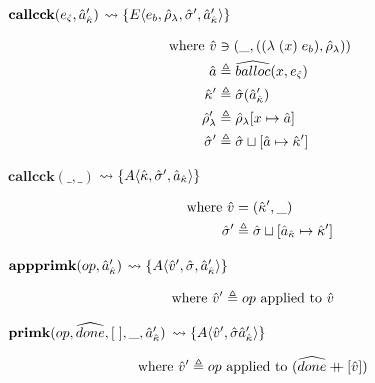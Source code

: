 \documentclass[12pt,draft]{article}
\newcommand\mdoubleplus{\ensuremath{\mathbin{+\mkern-9mu+}}}
\newcommand{\singlelamsyn}[2]{(\lambda\;(#1)\;#2)}
\begin{document}
\begin{multicols*}{2}
\begin{center}
  $\textbf{callcck}(e_{\hat{\varsigma}} , \hat{a}_{\hat{\kappa}}')$
  $\leadsto \{E\langle e_b , \hat{\rho}_{\lambda} , \hat{\sigma}' , \hat{a}_{\hat{\kappa}}' \rangle\}$
\end{center}
\vspace{-7mm}
\begin{align*}
  \text{where }
  \aval &\ni (\_ , (\singlelamsyn{x}{e_b} , \aenv_{\lambda})) \\
  \abaddr &\triangleq \aballoc{x , \ectrl} \\
  \akont' &\triangleq \astore(\akaddr') \\
  \aenv_{\lambda}' &\triangleq \aenv_{\lambda}[x \mapsto \abaddr] \\
  \astore' &\triangleq \astore \sqcup [\abaddr \mapsto \akont']
\end{align*}
\begin{center}
  $\textbf{callcck}(\_, \_)$
  $\leadsto \{A\langle \hat{\kappa} , \hat{\sigma}' , \hat{a}_{\hat{\kappa}} \rangle\}$
\end{center}
\vspace{-7mm}
\begin{align*}
  \text{where }
  \hat{v} &= (\hat{\kappa}' , \_) \\
  \hat{\sigma}' &\triangleq \hat{\sigma} \sqcup [\hat{a}_{\hat{\kappa}} \mapsto \hat{\kappa}']
\end{align*}
\begin{center}
  $\textbf{appprimk}(op, \hat{a}_{\hat{\kappa}}')$
  $\leadsto \{A\langle \hat{v}' , \hat{\sigma} , \hat{a}_{\hat{\kappa}}' \rangle\}$
\end{center}
\vspace{-7mm}
\begin{align*}
  \text{where } \hat{v}' &\triangleq op \text{ applied to } \hat{v}
\end{align*}
\begin{center}
  $\textbf{primk}(op, \widehat{done}, [\;], \_, \hat{a}_{\hat{\kappa}}')$
  $\leadsto \{A\langle \hat{v}' , \hat{\sigma} \hat{a}_{\hat{\kappa}}' \rangle\}$
\end{center}
\vspace{-7mm}
\begin{align*}
  \text{where }\aval'&\triangleq op\text{ applied to }(\adone \mdoubleplus [\aval])
\end{align*}
\begin{center}

\end{center}
\end{multicols*}
\end{document}
